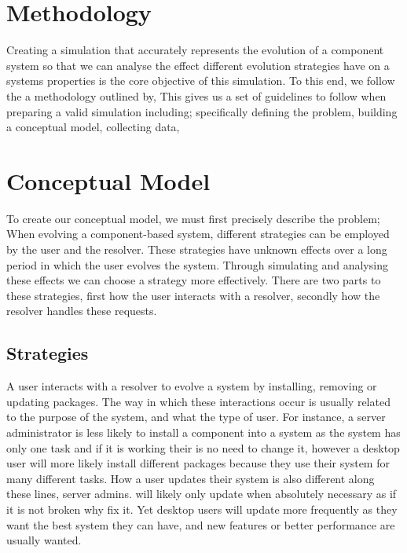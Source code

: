\section{Methodology}
Creating a simulation that accurately represents the evolution of a component system so that we can 
analyse the effect different evolution strategies have on a systems properties is the core objective of this simulation.
To this end, we follow the a methodology outlined by, %
This gives us a set of guidelines to follow when preparing a valid simulation including;
specifically defining the problem,
building a conceptual model,
collecting data,

\section{Conceptual Model}
To create our conceptual model, we must first precisely describe the problem;
{}When evolving a component-based system, different strategies can be employed by the user and the resolver.
{}These strategies have unknown effects over a long period in which the user evolves the system.
{}Through simulating and analysing these effects we can choose a strategy more effectively.
{}There are two parts to these strategies, first how the user interacts with a resolver, secondly how the resolver handles these requests.

\subsection{Strategies}
A user interacts with a resolver to evolve a system by installing, removing or updating packages.
The way in which these interactions occur is usually related to the purpose of the system, and what the type of user.
For instance, a server administrator is less likely to install a component into a system as the system has only one task and if it is working their is no need to change it, 
however a desktop user will more likely install different packages because they use their system for many different tasks.
How a user updates their system is also different along these lines, server admins. will likely only update when absolutely necessary as if it is not broken why fix it.
Yet desktop users will update more frequently as they want the best system they can have, and new features or better performance are usually wanted.

